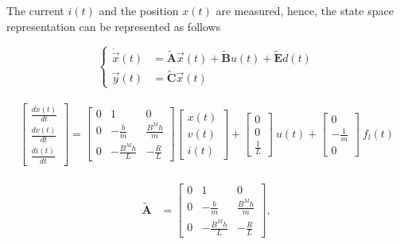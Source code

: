 \documentclass[11pt,a4paper,oneside]{book}
\numberwithin{equation}{section}
\theoremstyle{it}
\theoremstyle{definition}
\begin{document}
The current $i(t)$ and the position $x(t)$ are measured, hence, the state space 
representation can be represented as follows
\begin{mybox}
	\begin{equation*}
		\left\lbrace \begin{aligned}
			\dot{\vec{x}}(t) &= \tilde{\mathbf{A}} \vec{x}(t) + 
			\tilde{\mathbf{B}}u(t) + \tilde{\mathbf{E}}d(t)\\[6pt]
			{\vec{y}}(t) &= \tilde{\mathbf{C}} \vec{x}(t)
		\end{aligned}\right. 
	\end{equation*}\\
	\begin{equation*}
		\left[ 
		\begin{matrix}
			\frac{dx(t)}{dt} \\[6pt]
			\frac{dv(t)}{dt} \\[6pt]
			\frac{di(t)}{dt}
		\end{matrix} \right] = \left[ 
		\begin{matrix}
			0 & 1 & 0\\[6pt]
			0 & -\frac{b}{m} & \frac{B^{M}h}{m}\\[6pt]
			0 & -\frac{B^{M}h}{L} & -\frac{R}{L}
		\end{matrix} \right] \left[ 
		\begin{matrix}
			x(t) \\[6pt]
			v(t)\\[6pt]
			i(t)
		\end{matrix} \right] + 
		\left[ 
		\begin{matrix}
			0 \\[6pt]
			0 \\[6pt]
			\frac{1}{L}
		\end{matrix} \right] \ u(t) + 
		\left[ 
		\begin{matrix}
			0 \\[6pt]
			-\frac{1}{m} \\[6pt]
			0
		\end{matrix} \right] \ f_l(t)
	\end{equation*}\\
	\begin{equation*}
		\begin{aligned}
			\tilde{\mathbf{A}} &= \begin{bmatrix}
				0 & 1 & 0\\[6pt]
				0 & -\frac{b}{m} & \frac{B^{M}h}{m}\\[6pt]
				0 & -\frac{B^{M}h}{L} & -\frac{R}{L}
			\end{bmatrix}, 

\end{aligned}
\end{equation*}
\end{mybox}
\end{document}
